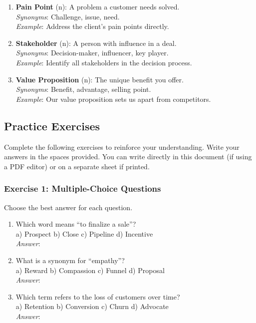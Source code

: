 \documentclass[11pt, a4paper]{article}
\begin{document}
\begin{enumerate}[label=\arabic*.]
          \textit{Synonyms}: Utilize, exploit, capitalize. \\
          \textit{Example}: Leverage data to improve your pitch.
    \item \textbf{Pain Point} (n): A problem a customer needs solved. \\
          \textit{Synonyms}: Challenge, issue, need. \\
          \textit{Example}: Address the client’s pain points directly.
    \item \textbf{Stakeholder} (n): A person with influence in a deal. \\
          \textit{Synonyms}: Decision-maker, influencer, key player. \\
          \textit{Example}: Identify all stakeholders in the decision process.
    \item \textbf{Value Proposition} (n): The unique benefit you offer. \\
          \textit{Synonyms}: Benefit, advantage, selling point. \\
          \textit{Example}: Our value proposition sets us apart from competitors.
\end{enumerate}

\subsection{Practice Exercises}
Complete the following exercises to reinforce your understanding. Write your answers in the spaces provided. You can write directly in this document (if using a PDF editor) or on a separate sheet if printed.

\subsubsection{Exercise 1: Multiple-Choice Questions}
Choose the best answer for each question.

\begin{enumerate}
    \item Which word means ``to finalize a sale''? \\
          a) Prospect \quad b) Close \quad c) Pipeline \quad d) Incentive \\
          \textit{Answer}: \underline{\hspace{3cm}}
    \item What is a synonym for ``empathy''? \\
          a) Reward \quad b) Compassion \quad c) Funnel \quad d) Proposal \\
          \textit{Answer}: \underline{\hspace{3cm}}
    \item Which term refers to the loss of customers over time? \\
          a) Retention \quad b) Conversion \quad c) Churn \quad d) Advocate \\
          \textit{Answer}: \underline{\hspace{3cm}}
\end{enumerate}
\end{document}
